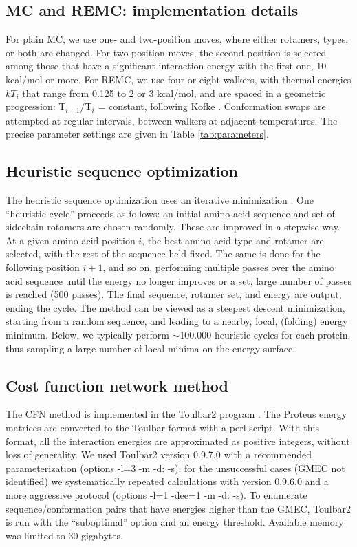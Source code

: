 \documentclass[a4paper,12pt]{article}
\begin{document}
\subsection{MC and REMC: implementation details}
For plain MC, we use one- and two-position moves, where either rotamers, types, or both are changed. For two-position
moves, the second position is selected among those that have a significant interaction energy with the first
one, 10 kcal/mol or more. For REMC, we use four or eight walkers, with thermal energies $kT_i$ that range from 0.125
to 2 or 3 kcal/mol, and are spaced in a geometric progression: T$_{i+1}$/T$_i$ = constant, following Kofke \cite{Kofke02}.
Conformation swaps are attempted at regular intervals, between walkers at adjacent temperatures. The precise parameter
settings are given in Table \ref{tab:parameters}.

\subsection{Heuristic sequence optimization}
The heuristic sequence optimization uses an iterative minimization \cite{Wernisch00,Schmidt08}. One ``heuristic cycle''
proceeds as follows: an initial amino acid sequence and set of sidechain rotamers are chosen randomly. These are
improved in a stepwise way. At a given amino acid position $i$, the best amino acid type and rotamer are selected,
with the rest of the sequence held fixed. The same is done for the following position $i+1$, and so on, performing
multiple passes over the amino acid sequence until the energy no longer improves or a set, large number of passes
is reached (500 passes). The final sequence, rotamer set, and energy are output, ending the cycle. The method can be
viewed as a steepest descent minimization, starting from a random sequence, and leading to a nearby, local, (folding)
energy minimum. Below, we typically perform ${\sim}$100.000 heuristic cycles for each protein, thus sampling a large
number of local minima on the energy surface. 

\subsection{Cost function network method}
The CFN method is implemented in the Toulbar2 program \cite{Traore13,Allouche14}. The Proteus energy matrices
are converted to the Toulbar format with a perl script. With this format, all the interaction energies are approximated
as positive integers, without loss of generality. We used Toulbar2 version 0.9.7.0 with a recommended parameterization
(options -l=3 -m -d: -s); for the unsuccessful cases (GMEC not identified) we systematically repeated calculations with
version 0.9.6.0 and a more aggressive protocol (options -l=1 -dee=1 -m -d: -s). To enumerate sequence/conformation pairs
that have energies higher than the GMEC, Toulbar2 is run with the ``suboptimal'' option and an energy threshold. Available
memory was limited to 30 gigabytes.
\end{document}
